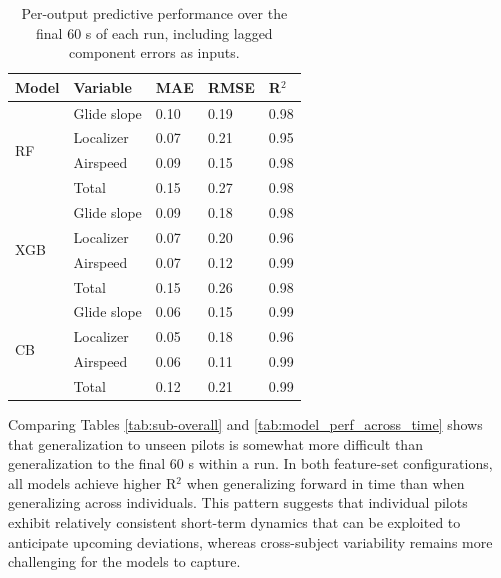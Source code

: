 \documentclass[11pt, a4paper]{article}
\begin{document}
\begin{table}[htbp]
	\caption{Per-output predictive performance over the final 60 s of each run, including lagged component errors as inputs.}
	\label{tab:output_perf_lag}
	\centering
	\small
	\begin{tabular}{lllll}
		\toprule                                 	
		Model 	&Variable    & MAE      &  RMSE      &R$^2$ \\ 
		\midrule
		\multirow{4}{*}{RF} 	&Glide slope  	& 0.10 	 & 0.19  & 0.98	\\
								&Localizer			& 0.07	& 0.21	& 0.95 \\
								&Airspeed			& 0.09	& 0.15	& 0.98	\\
								&Total				&0.15	&0.27	&0.98	\\
		
		
		
		\midrule
		\multirow{4}{*}{XGB} 		&Glide slope   &0.09   & 0.18 	& 0.98 \\
									&Localizer		&0.07 & 0.20 	& 0.96 \\
									&Airspeed		&0.07	& 0.12 	& 0.99  \\
									&Total			&0.15	 &0.26	 &0.98  \\
		
		
		
		\midrule 
		\multirow{4}{*}{CB} 		&Glide slope   & 0.06	 & 0.15	  	& 0.99	\\
									&Localizer     	& 0.05  & 0.18		& 0.96	\\
									&Airspeed		& 0.06 	& 0.11		& 0.99	\\
									&Total			&0.12	&0.21		&0.99	\\			
		\bottomrule
	\end{tabular}
\end{table}

Comparing Tables \ref{tab:sub-overall} and \ref{tab:model_perf_across_time} shows that generalization to unseen pilots is somewhat more difficult than generalization to the final 60 s within a run. In both feature-set configurations, all models achieve higher R$^2$ when generalizing forward in time than when generalizing across individuals. This pattern suggests that individual pilots exhibit relatively consistent short-term dynamics that can be exploited to anticipate upcoming deviations, whereas cross-subject variability remains more challenging for the models to capture.
\end{document}
